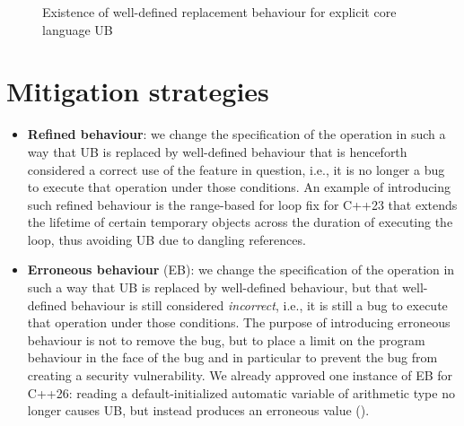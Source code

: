 \begin{figure}[t]
    \centering
    \caption{Existence of well-defined replacement behaviour for explicit core language UB}
    \label{piechart_replacement}
\end{figure}

\section{Mitigation strategies}
\label{mitigation}

\begin{itemize}
\item \textbf{Refined behaviour}: we change the specification of the operation in such a way that UB is replaced by well-defined behaviour that is henceforth considered a correct use of the feature in question, i.e., it is no longer a bug to execute that operation under those conditions. An example of introducing such refined behaviour is the range-based for loop fix \cite{P2644R1} for C++23 that extends the lifetime of certain temporary objects across the duration of executing the loop, thus avoiding UB due to dangling references.
\item \textbf{Erroneous behaviour} (EB): we change the specification of the operation in such a way that UB is replaced by well-defined behaviour, but that well-defined behaviour is still considered \emph{incorrect}, i.e., it is still a bug to execute that operation under those conditions. The purpose of introducing erroneous behaviour is not to remove the bug, but to place a limit on the program behaviour in the face of the bug and in particular to prevent the bug from creating a security vulnerability. We already approved one instance of EB for C++26:  reading a default-initialized automatic variable of arithmetic type no longer causes UB, but instead produces an erroneous value (\cite{P2795R5}).
\end{itemize}

